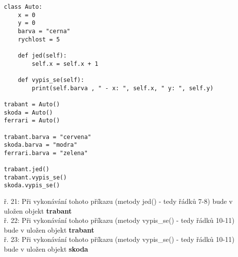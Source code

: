 \begin{minipage}[t]{.45\textwidth}
\begin{code}
\begin{verbatim}
class Auto:
	x = 0
	y = 0
	barva = "cerna"
	rychlost = 5
	
	def jed(self):
		self.x = self.x + 1
		
	def vypis_se(self):
		print(self.barva , " - x: ", self.x, " y: ", self.y)
		
trabant = Auto()
skoda = Auto()
ferrari = Auto()

trabant.barva = "cervena"
skoda.barva = "modra"
ferrari.barva = "zelena"

trabant.jed()
trabant.vypis_se()
skoda.vypis_se()
\end{verbatim}
\label{code:trida-self}
\end{code}
\end{minipage}
\begin{minipage}[t]{.45\textwidth}
ř. 21:		Při vykonávání tohoto příkazu (metody jed() - tedy řádků 7-8) bude v  uložen objekt \textbf{trabant}\\
ř. 22:		Při vykonávání tohoto příkazu (metody vypis\_se() - tedy řádků 10-11) bude v  uložen objekt \textbf{trabant}\\
ř. 23:		Při vykonávání tohoto příkazu (metody vypis\_se() - tedy řádků 10-11) bude v  uložen objekt \textbf{skoda}
\end{minipage}

